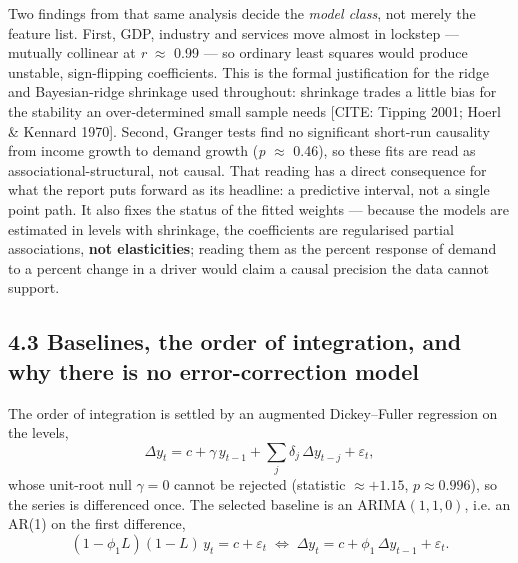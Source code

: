 \documentclass[10pt,twocolumn]{article}
\newcommand{\mk}[1]{{\color{amber}\small #1}}
\begin{document}
Two findings from that same analysis decide the \textit{model class}, not merely the feature list. First, GDP, industry and services move almost in lockstep --- mutually collinear at \textit{r} $\approx$ 0.99 --- so ordinary least squares would produce unstable, sign-flipping coefficients. This is the formal justification for the ridge and Bayesian-ridge shrinkage used throughout: shrinkage trades a little bias for the stability an over-determined small sample needs \mk{[CITE: Tipping 2001; Hoerl \& Kennard 1970]}. Second, Granger tests find no significant short-run causality from income growth to demand growth (\textit{p} $\approx$ 0.46), so these fits are read as associational-structural, not causal. That reading has a direct consequence for what the report puts forward as its headline: a predictive interval, not a single point path. It also fixes the status of the fitted weights --- because the models are estimated in levels with shrinkage, the coefficients are regularised partial associations, \textbf{not elasticities}; reading them as the percent response of demand to a percent change in a driver would claim a causal precision the data cannot support.

\subsection*{4.3 Baselines, the order of integration, and why there is no error-correction model}

\noindent The order of integration is settled by an augmented Dickey--Fuller
regression on the levels,
\begin{equation}
\Delta y_t=c+\gamma\,y_{t-1}+\textstyle\sum_{j}\delta_j\,\Delta y_{t-j}+\varepsilon_t,
\label{eq:adf}
\end{equation}
whose unit-root null $\gamma=0$ cannot be rejected (statistic $\approx+1.15$,
$p\approx0.996$), so the series is differenced once. The selected baseline is an
$\mathrm{ARIMA}(1,1,0)$, i.e. an AR(1) on the first difference,
\begin{equation}
(1-\phi_1 L)(1-L)\,y_t=c+\varepsilon_t
\;\Longleftrightarrow\;
\Delta y_t=c+\phi_1\,\Delta y_{t-1}+\varepsilon_t .
\label{eq:arima}
\end{equation}
\end{document}
